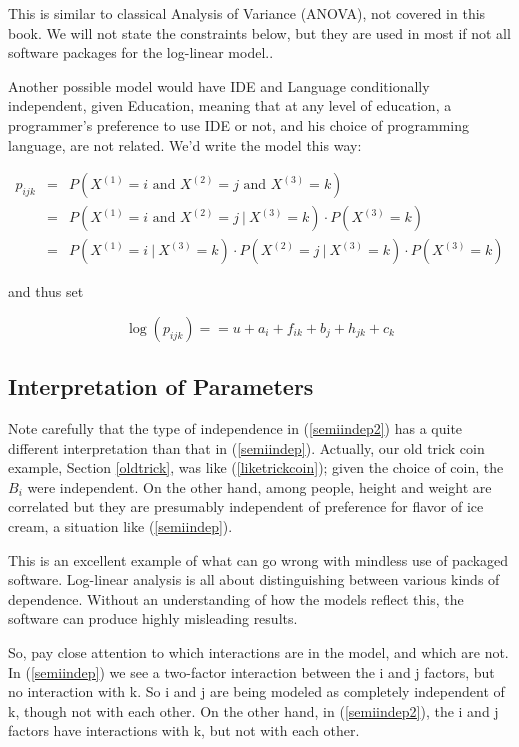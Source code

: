 This is similar to classical Analysis of Variance (ANOVA), not covered
in this book.  We will not state the constraints below, but they are
used in most if not all software packages for the log-linear model..

Another possible model would have IDE and Language conditionally
independent, given Education, meaning that at any level of education, a
programmer's preference to use IDE or not, and his choice of programming
language, are not related.  We'd write the model this way:

\begin{eqnarray}
p_{ijk} &=& 
   P \left ( X^{(1)} = i \textrm{ and } 
             X^{(2)} = j \textrm{ and } 
             X^{(3)} = k \right ) \\
&=& P \left ( X^{(1)} = i \textrm{ and } X^{(2)} = j ~|~ X^{(3)} = k \right)
    \cdot P \left ( X^{(3)} = k \right ) \\
&=& P \left ( X^{(1)} = i ~|~ X^{(3)} = k \right ) \cdot
    P \left ( X^{(2)} = j ~|~ X^{(3)} = k \right) \cdot
    P \left ( X^{(3)} = k \right ) 
\label{liketrickcoin}
\end{eqnarray} 

and thus set

\begin{equation}
\log(p_{ijk}) =
= u + a_i + f_{ik} + b_j + h_{jk} + c_k 
\label{semiindep2}
\end{equation}

\subsection{Interpretation of Parameters}

Note carefully that the type of independence in (\ref{semiindep2}) has a
quite different interpretation than that in (\ref{semiindep}).
Actually, our old trick coin example, Section \ref{oldtrick}, was like
(\ref{liketrickcoin}); given the choice of coin, the $B_i$ were
independent.  On the other hand, among people, height and weight are
correlated but they are presumably independent of preference for flavor
of ice cream, a situation like (\ref{semiindep}).

This is an excellent example of what can go wrong with mindless use of
packaged software.  Log-linear analysis is all about distinguishing
between various kinds of dependence.  Without an understanding of how
the models reflect this, the software can produce highly misleading
results.

So, pay close attention to which interactions are in the model, and
which are not.  In (\ref{semiindep}) we see a two-factor interaction
between the i and j factors, but no interaction with k.  So i and j
are being modeled as completely independent of k, though not with each
other.  On the other hand, in (\ref{semiindep2}), the i and j factors have
interactions with k, but not with each other.

